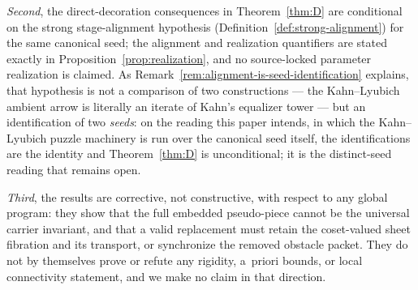 \documentclass[11pt,reqno]{amsart}
\theoremstyle{definition}
\theoremstyle{remark}
\begin{document}
\emph{Second}, the direct-decoration consequences in
Theorem~\ref{thm:D} are conditional on the strong stage-alignment
hypothesis (Definition~\ref{def:strong-alignment}) for the same
canonical seed; the alignment and realization
quantifiers are stated exactly in Proposition~\ref{prop:realization},
and no source-locked parameter realization is claimed.  As
Remark~\ref{rem:alignment-is-seed-identification} explains, that
hypothesis is not a comparison of two constructions --- the
Kahn--Lyubich ambient arrow is literally an iterate of Kahn's
equalizer tower --- but an identification of two \emph{seeds}: on the
reading this paper intends, in which the Kahn--Lyubich puzzle
machinery is run over the canonical seed itself, the identifications
are the identity and Theorem~\ref{thm:D} is unconditional; it is the
distinct-seed reading that remains open.

\emph{Third}, the results are corrective, not constructive, with
respect to any global program: they show that the full embedded
pseudo-piece cannot be the universal carrier invariant, and that a
valid replacement must retain the coset-valued sheet fibration and its
transport, or synchronize the removed obstacle packet.  They do not by
themselves prove or refute any rigidity, a~priori bounds, or local
connectivity statement, and we make no claim in that direction.
\end{document}
